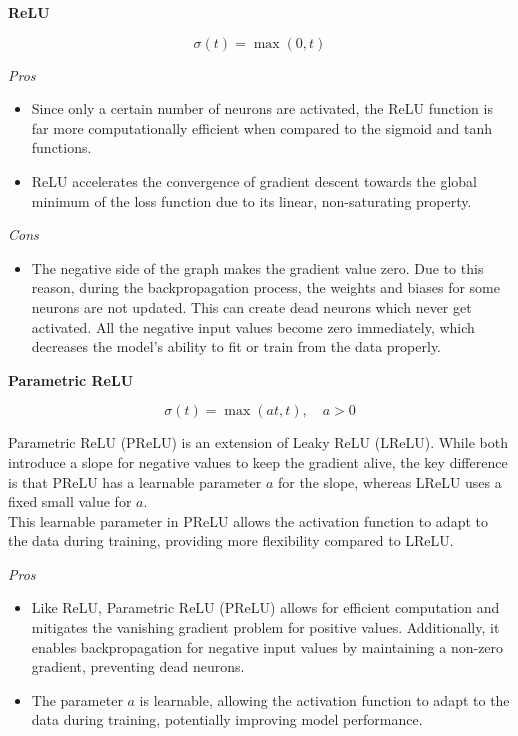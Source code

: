 \textbf{ReLU}

$$\sigma(t)=\max(0,t)$$

\textit{Pros}

\begin{itemize}
  \item Since only a certain number of neurons are activated, the ReLU function is far
more computationally efficient when compared to the sigmoid and tanh
functions.
  \item ReLU accelerates the convergence of gradient descent towards the global
minimum of the loss function due to its linear, non-saturating property.
\end{itemize}

\textit{Cons}

\begin{itemize}
  \item The negative side of the graph makes the gradient value zero. Due to this reason,
during the backpropagation process, the weights and biases for some neurons are
not updated. This can create dead neurons which never get activated.
All the negative input values become zero immediately, which decreases the
model’s ability to fit or train from the data properly.
\end{itemize}

\textbf{Parametric ReLU}

$$\sigma(t)=\max(at,t), \quad a>0$$

Parametric ReLU (PReLU) is an extension of Leaky ReLU (LReLU). While both introduce a slope for negative values to keep the gradient alive, the key difference is that PReLU has a learnable parameter \(a\) for the slope, whereas LReLU uses a fixed small value for \(a\). \\  This learnable parameter in PReLU allows the activation function to adapt to the data during training, providing more flexibility compared to LReLU.

\textit{Pros}

\begin{itemize}
\item Like ReLU, Parametric ReLU (PReLU) allows for efficient computation and mitigates the vanishing gradient problem for positive values. Additionally, it enables backpropagation for negative input values by maintaining a non-zero gradient, preventing dead neurons.
\item The parameter \(a\) is learnable, allowing the activation function to adapt to the data during training, potentially improving model performance.
\end{itemize}

